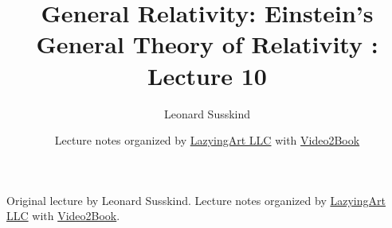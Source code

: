 \documentclass[11pt,oneside]{book}
\begin{document}
\frontmatter
\title{General Relativity: Einstein's General Theory of Relativity : Lecture 10}
\author{Leonard Susskind}
\date{Lecture notes organized by \href{https://lazying.art}{LazyingArt LLC} with \href{https://github.com/lachlanchen/Video2Book}{Video2Book}}
\maketitle
\begin{center}
\small Original lecture by Leonard Susskind. Lecture notes organized by \href{https://lazying.art}{LazyingArt LLC} with \href{https://github.com/lachlanchen/Video2Book}{Video2Book}.
\end{center}
\clearpage
\mainmatter

\end{document}

